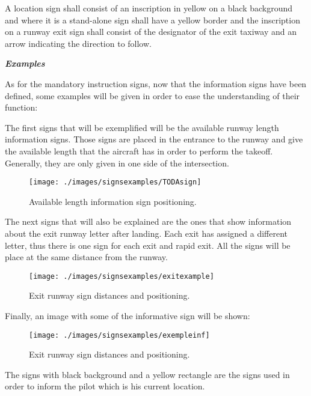 	A location sign shall consist of an inscription in yellow on a black background and where it is a stand-alone sign shall have a yellow border and the inscription on a runway exit sign shall consist of the designator of the exit taxiway and an arrow indicating the direction to follow.
	
	\textbf{\textit{Examples}}
	
	As for the mandatory instruction signs, now that the information signs have been defined, some examples will be given in order to ease the understanding of their function: 
	
	The first signs that will be exemplified will be the available runway length information signs. Those signs are placed in the entrance to the runway and give the available length that the aircraft has in order to perform the takeoff. Generally, they are only given in one side of the intersection. 
	
	\begin{figure}[H]
		\centering
		\texttt{[image: ./images/signsexamples/TODAsign]}
		\caption{Available length information sign positioning.} %
		\label{} %
	\end{figure}

	The next signs that will also be explained are the ones that show information about the exit runway letter after landing. Each exit has assigned a different letter, thus there is one sign for each exit and rapid exit. All the signs will be place at the same distance from the runway. 
	
	\begin{figure}[H]
		\centering
		\texttt{[image: ./images/signsexamples/exitexample]}
		\caption{Exit runway sign distances and positioning.} %
		\label{} %
	\end{figure}

	Finally, an image with some of the informative sign will be shown:
	
	\begin{figure}[H]
		\centering
		\texttt{[image: ./images/signsexamples/exempleinf]}
		\caption{Exit runway sign distances and positioning.} %
		\label{} %
	\end{figure}
	
	The signs with black background and a yellow rectangle are the signs used in order to inform the pilot which is his current location. 
	

	